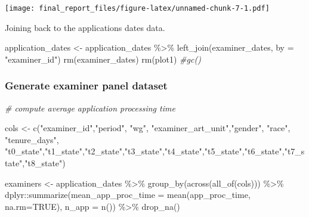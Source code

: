 \documentclass[
]{article}
\newenvironment{Shaded}{\begin{snugshade}}{\end{snugshade}}
\newcommand{\AttributeTok}[1]{\textcolor[rgb]{0.77,0.63,0.00}{#1}}
\newcommand{\CommentTok}[1]{\textcolor[rgb]{0.56,0.35,0.01}{\textit{#1}}}
\newcommand{\ConstantTok}[1]{\textcolor[rgb]{0.00,0.00,0.00}{#1}}
\newcommand{\FunctionTok}[1]{\textcolor[rgb]{0.00,0.00,0.00}{#1}}
\newcommand{\NormalTok}[1]{#1}
\newcommand{\OtherTok}[1]{\textcolor[rgb]{0.56,0.35,0.01}{#1}}
\newcommand{\SpecialCharTok}[1]{\textcolor[rgb]{0.00,0.00,0.00}{#1}}
\newcommand{\StringTok}[1]{\textcolor[rgb]{0.31,0.60,0.02}{#1}}
\begin{document}
\texttt{[image: final\_report\_files/figure-latex/unnamed-chunk-7-1.pdf]}

Joining back to the applications dates data.

\begin{Shaded}
\begin{Highlighting}[]
\NormalTok{application\_dates }\OtherTok{\textless{}{-}}\NormalTok{ application\_dates }\SpecialCharTok{\%\textgreater{}\%} 
  \FunctionTok{left\_join}\NormalTok{(examiner\_dates, }\AttributeTok{by =} \StringTok{"examiner\_id"}\NormalTok{)}
\FunctionTok{rm}\NormalTok{(examiner\_dates)}
\FunctionTok{rm}\NormalTok{(plot1)}
\CommentTok{\#gc()}
\end{Highlighting}
\end{Shaded}

\hypertarget{generate-examiner-panel-dataset}{%
\subsubsection{Generate examiner panel
dataset}\label{generate-examiner-panel-dataset}}

\begin{Shaded}
\begin{Highlighting}[]
\CommentTok{\# compute average application processing time}

\NormalTok{cols }\OtherTok{\textless{}{-}} \FunctionTok{c}\NormalTok{(}\StringTok{"examiner\_id"}\NormalTok{,}\StringTok{"period"}\NormalTok{, }\StringTok{"wg"}\NormalTok{, }\StringTok{"examiner\_art\_unit"}\NormalTok{,}\StringTok{"gender"}\NormalTok{, }\StringTok{"race"}\NormalTok{, }\StringTok{"tenure\_days"}\NormalTok{,}
          \StringTok{"t0\_state"}\NormalTok{,}\StringTok{"t1\_state"}\NormalTok{,}\StringTok{"t2\_state"}\NormalTok{,}\StringTok{"t3\_state"}\NormalTok{,}\StringTok{"t4\_state"}\NormalTok{,}\StringTok{"t5\_state"}\NormalTok{,}\StringTok{"t6\_state"}\NormalTok{,}\StringTok{"t7\_state"}\NormalTok{,}\StringTok{"t8\_state"}\NormalTok{)}

\NormalTok{examiners }\OtherTok{\textless{}{-}}\NormalTok{ application\_dates }\SpecialCharTok{\%\textgreater{}\%}
    \FunctionTok{group\_by}\NormalTok{(}\FunctionTok{across}\NormalTok{(}\FunctionTok{all\_of}\NormalTok{(cols))) }\SpecialCharTok{\%\textgreater{}\%}
\NormalTok{    dplyr}\SpecialCharTok{::}\FunctionTok{summarize}\NormalTok{(}\AttributeTok{mean\_app\_proc\_time =} \FunctionTok{mean}\NormalTok{(app\_proc\_time, }\AttributeTok{na.rm=}\ConstantTok{TRUE}\NormalTok{), }\AttributeTok{n\_app =} \FunctionTok{n}\NormalTok{()) }\SpecialCharTok{\%\textgreater{}\%}
    \FunctionTok{drop\_na}\NormalTok{()}
\end{Highlighting}
\end{Shaded}
\end{document}

